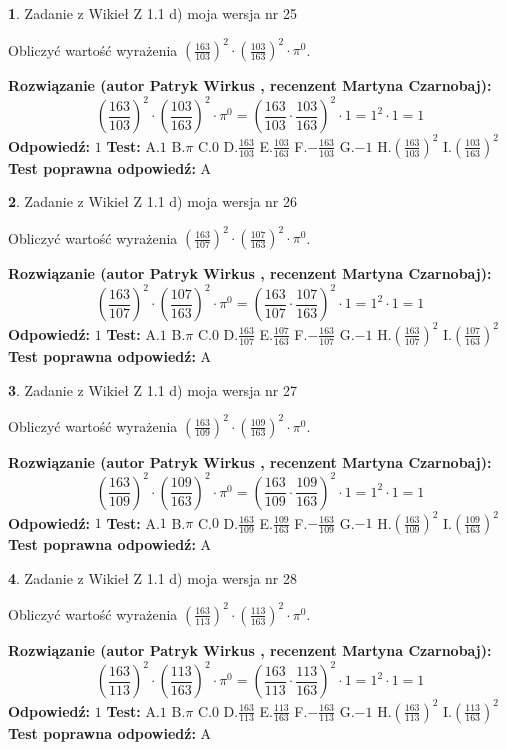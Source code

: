 \documentclass[12pt, a4paper]{article}
\theoremstyle{definition} %
\newtheorem{zad}{}
\newcommand{\zadStart}[1]{\begin{zad}#1\newline}
\newcommand{\zadStop}{\end{zad}}
\newcommand{\rozwStart}[2]{\noindent \textbf{Rozwiązanie (autor #1 , recenzent #2): }\newline}
\newcommand{\rozwStop}{\newline}
\newcommand{\odpStart}{\noindent \textbf{Odpowiedź:}\newline}
\newcommand{\odpStop}{\newline}
\newcommand{\testStart}{\noindent \textbf{Test:}\newline}
\newcommand{\testStop}{\newline}
\newcommand{\kluczStart}{\noindent \textbf{Test poprawna odpowiedź:}\newline}
\newcommand{\kluczStop}{\newline}
\begin{document}
\zadStart{Zadanie z Wikieł Z 1.1 d) moja wersja nr 25}

Obliczyć wartość wyrażenia $(\frac{163}{103})^{2} \cdot (\frac{103}{163})^{2} \cdot \pi^{0}$.
\zadStop
\rozwStart{Patryk Wirkus}{Martyna Czarnobaj}
$$(\frac{163}{103})^{2} \cdot (\frac{103}{163})^{2} \cdot \pi^{0} = (\frac{163}{103} \cdot \frac{103}{163})^{2} \cdot 1 = 1^{2} \cdot 1 = 1$$
\rozwStop
\odpStart
$1$
\odpStop
\testStart
A.$1$ B.$\pi$ C.$0$ D.$\frac{163}{103}$ E.$\frac{103}{163}$
F.$-\frac{163}{103}$ G.$-1$
H.$(\frac{163}{103})^{2}$
I.$(\frac{103}{163})^{2}$
\testStop
\kluczStart
A
\kluczStop



\zadStart{Zadanie z Wikieł Z 1.1 d) moja wersja nr 26}

Obliczyć wartość wyrażenia $(\frac{163}{107})^{2} \cdot (\frac{107}{163})^{2} \cdot \pi^{0}$.
\zadStop
\rozwStart{Patryk Wirkus}{Martyna Czarnobaj}
$$(\frac{163}{107})^{2} \cdot (\frac{107}{163})^{2} \cdot \pi^{0} = (\frac{163}{107} \cdot \frac{107}{163})^{2} \cdot 1 = 1^{2} \cdot 1 = 1$$
\rozwStop
\odpStart
$1$
\odpStop
\testStart
A.$1$ B.$\pi$ C.$0$ D.$\frac{163}{107}$ E.$\frac{107}{163}$
F.$-\frac{163}{107}$ G.$-1$
H.$(\frac{163}{107})^{2}$
I.$(\frac{107}{163})^{2}$
\testStop
\kluczStart
A
\kluczStop



\zadStart{Zadanie z Wikieł Z 1.1 d) moja wersja nr 27}

Obliczyć wartość wyrażenia $(\frac{163}{109})^{2} \cdot (\frac{109}{163})^{2} \cdot \pi^{0}$.
\zadStop
\rozwStart{Patryk Wirkus}{Martyna Czarnobaj}
$$(\frac{163}{109})^{2} \cdot (\frac{109}{163})^{2} \cdot \pi^{0} = (\frac{163}{109} \cdot \frac{109}{163})^{2} \cdot 1 = 1^{2} \cdot 1 = 1$$
\rozwStop
\odpStart
$1$
\odpStop
\testStart
A.$1$ B.$\pi$ C.$0$ D.$\frac{163}{109}$ E.$\frac{109}{163}$
F.$-\frac{163}{109}$ G.$-1$
H.$(\frac{163}{109})^{2}$
I.$(\frac{109}{163})^{2}$
\testStop
\kluczStart
A
\kluczStop



\zadStart{Zadanie z Wikieł Z 1.1 d) moja wersja nr 28}

Obliczyć wartość wyrażenia $(\frac{163}{113})^{2} \cdot (\frac{113}{163})^{2} \cdot \pi^{0}$.
\zadStop
\rozwStart{Patryk Wirkus}{Martyna Czarnobaj}
$$(\frac{163}{113})^{2} \cdot (\frac{113}{163})^{2} \cdot \pi^{0} = (\frac{163}{113} \cdot \frac{113}{163})^{2} \cdot 1 = 1^{2} \cdot 1 = 1$$
\rozwStop
\odpStart
$1$
\odpStop
\testStart
A.$1$ B.$\pi$ C.$0$ D.$\frac{163}{113}$ E.$\frac{113}{163}$
F.$-\frac{163}{113}$ G.$-1$
H.$(\frac{163}{113})^{2}$
I.$(\frac{113}{163})^{2}$
\testStop
\kluczStart
A
\kluczStop
\end{document}
